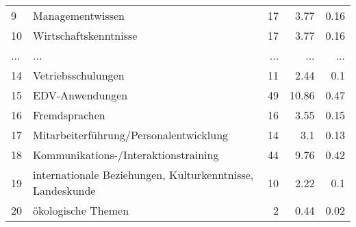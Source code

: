 \begin{longtable}{lXrrr}
        9 & \multicolumn{1}{X}{Managementwissen} & %
          \num{17} &
          \num[round-mode=places,round-precision=2]{3,77} &
          \num[round-mode=places,round-precision=2]{0,16} \\
        10 & \multicolumn{1}{X}{Wirtschaftskenntnisse} & %
          \num{17} &
          \num[round-mode=places,round-precision=2]{3,77} &
          \num[round-mode=places,round-precision=2]{0,16} \\
       ... & ... & ... & ... & ... \\
        14 & \multicolumn{1}{X}{Vetriebsschulungen} & %
          \num{11} &
          \num[round-mode=places,round-precision=2]{2,44} &
          \num[round-mode=places,round-precision=2]{0,1} \\

        15 & \multicolumn{1}{X}{EDV-Anwendungen} & %
          \num{49} &
          \num[round-mode=places,round-precision=2]{10,86} &
          \num[round-mode=places,round-precision=2]{0,47} \\

        16 & \multicolumn{1}{X}{Fremdsprachen} & %
          \num{16} &
          \num[round-mode=places,round-precision=2]{3,55} &
          \num[round-mode=places,round-precision=2]{0,15} \\

        17 & \multicolumn{1}{X}{Mitarbeiterführung/Personalentwicklung} & %
          \num{14} &
          \num[round-mode=places,round-precision=2]{3,1} &
          \num[round-mode=places,round-precision=2]{0,13} \\

        18 & \multicolumn{1}{X}{Kommunikations-/Interaktionstraining} & %
          \num{44} &
          \num[round-mode=places,round-precision=2]{9,76} &
          \num[round-mode=places,round-precision=2]{0,42} \\

        19 & \multicolumn{1}{X}{internationale Beziehungen, Kulturkenntnisse, Landeskunde} & %
          \num{10} &
          \num[round-mode=places,round-precision=2]{2,22} &
          \num[round-mode=places,round-precision=2]{0,1} \\

        20 & \multicolumn{1}{X}{ökologische Themen} & %
          \num{2} &
          \num[round-mode=places,round-precision=2]{0,44} &
          \num[round-mode=places,round-precision=2]{0,02} \\


\end{longtable}
